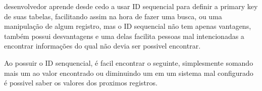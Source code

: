 
 desenvolvedor aprende desde cedo a usar ID sequencial para definir a primary key de suas tabelas, 
facilitando assim na hora de fazer uma busca, ou uma manipulação de algum registro, mas o ID sequencial não tem apenas vantagens,
também possui desvantagens e uma delas facilita pessoas  mal intencionadas a encontrar informações do qual não devia ser possivel encontrar.

Ao possuir o ID senquencial, é facil encontrar o seguinte, simplesmente somando mais um ao valor encontrado ou diminuindo um 
em um sistema mal configurado é possivel saber os valores dos proximos registros.